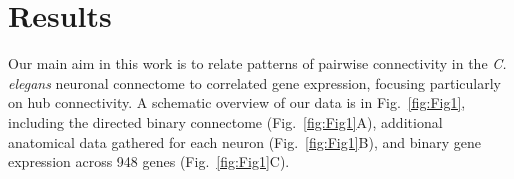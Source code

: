 \documentclass[10pt,letterpaper]{article}
\begin{document}




\section*{Results}
Our main aim in this work is to relate patterns of pairwise connectivity in the \emph{C. elegans} neuronal connectome to correlated gene expression, focusing particularly on hub connectivity.
A schematic overview of our data is in Fig.~\ref{fig:Fig1}, including
the directed binary connectome (Fig.~\ref{fig:Fig1}A),
additional anatomical data gathered for each neuron (Fig.~\ref{fig:Fig1}B),
and binary gene expression across 948 genes (Fig.~\ref{fig:Fig1}C).
\end{document}
